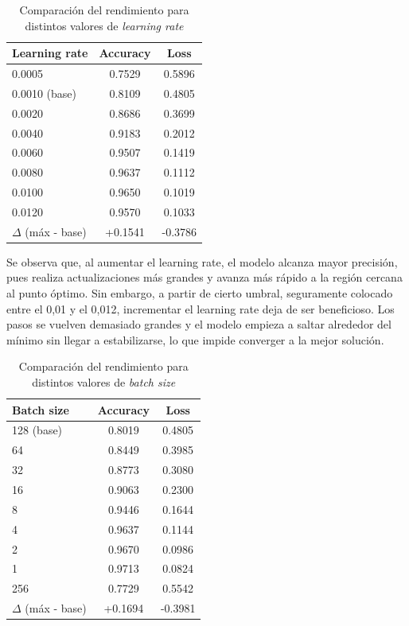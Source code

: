 \documentclass[conference,a4paper]{IEEEtran}
\begin{document}
\begin{table}[h]
\centering
\caption{Comparación del rendimiento para distintos valores de \textit{learning rate}}
\label{tab:learningrate_experimento}
\begin{tabular}{lcc}
\hline
\textbf{Learning rate} & \textbf{Accuracy} & \textbf{Loss} \\
\hline
0.0005 & 0.7529 & 0.5896 \\
0.0010 (base) & 0.8109 & 0.4805 \\
0.0020 & 0.8686 & 0.3699 \\
0.0040 & 0.9183 & 0.2012 \\
0.0060 & 0.9507 & 0.1419 \\
0.0080 & 0.9637 & 0.1112 \\
0.0100 & 0.9650 & 0.1019 \\
0.0120 & 0.9570 & 0.1033 \\
\hline
$\Delta$ (máx - base) & +0.1541 & -0.3786 \\
\hline
\end{tabular}
\end{table}

Se observa que, al aumentar el learning rate, el modelo alcanza mayor precisión, pues realiza actualizaciones más grandes y avanza más rápido a la región cercana al punto óptimo. Sin embargo, a partir de cierto umbral, seguramente colocado entre el 0,01 y el 0,012, incrementar el learning rate deja de ser beneficioso. Los pasos se vuelven demasiado grandes y el modelo empieza a saltar alrededor del mínimo sin llegar a estabilizarse, lo que impide converger a la mejor solución.

\begin{table}[h]
\centering
\caption{Comparación del rendimiento para distintos valores de \textit{batch size}}
\label{tab:batchsize_experimento}
\begin{tabular}{lcc}
\hline
\textbf{Batch size} & \textbf{Accuracy} & \textbf{Loss} \\
\hline
128 (base) & 0.8019 & 0.4805 \\
64  & 0.8449 & 0.3985 \\
32  & 0.8773 & 0.3080 \\
16  & 0.9063 & 0.2300 \\
8   & 0.9446 & 0.1644 \\
4   & 0.9637 & 0.1144 \\
2   & 0.9670 & 0.0986 \\
1   & 0.9713 & 0.0824 \\
256   & 0.7729 & 0.5542 \\
\hline
$\Delta$ (máx - base) & +0.1694 & -0.3981 \\
\hline
\end{tabular}
\end{table}
\end{document}
